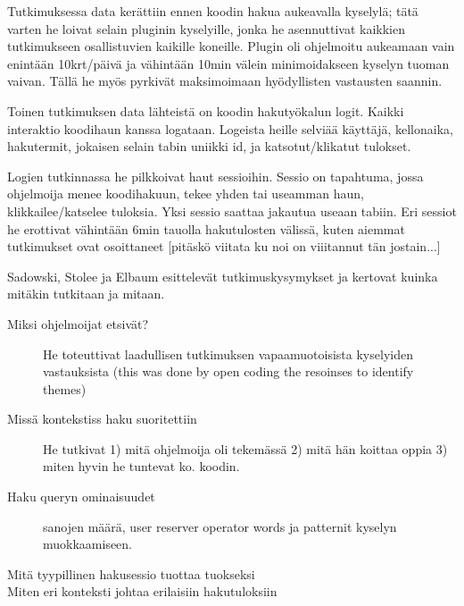 \documentclass[finnish]{../tktltiki2}
\theoremstyle{definition}
\theoremstyle{remark}
\begin{document}
Tutkimuksessa data kerättiin ennen koodin hakua aukeavalla kyselylä; tätä varten he loivat selain pluginin kyselyille, jonka he asennuttivat kaikkien tutkimukseen osallistuvien kaikille koneille. Plugin oli ohjelmoitu aukeamaan vain enintään 10krt/päivä ja vähintään 10min välein minimoidakseen kyselyn tuoman vaivan. Tällä he myös pyrkivät maksimoimaan hyödyllisten vastausten saannin.


Toinen tutkimuksen data lähteistä on koodin hakutyökalun logit. Kaikki interaktio koodihaun kanssa logataan. Logeista heille selviää käyttäjä, kellonaika, hakutermit, jokaisen selain tabin uniikki id, ja katsotut/klikatut tulokset.

Logien tutkinnassa he pilkkoivat haut sessioihin. Sessio on tapahtuma, jossa ohjelmoija menee koodihakuun, tekee yhden tai useamman haun, klikkailee/katselee tuloksia. Yksi sessio saattaa jakautua useaan tabiin. Eri sessiot he erottivat vähintään 6min tauolla hakutulosten välissä, kuten aiemmat tutkimukset ovat osoittaneet [pitäskö viitata ku noi on viiitannut tän jostain...]



Sadowski, Stolee ja Elbaum esittelevät tutkimuskysymykset ja kertovat kuinka mitäkin tutkitaan ja mitaan.

\begin{description}

  \item [Miksi ohjelmoijat etsivät?] He toteuttivat laadullisen tutkimuksen vapaamuotoisista kyselyiden vastauksista (this was done by open coding the resoinses to identify themes)

  \item [Missä kontekstiss haku suoritettiin] He tutkivat 1) mitä ohjelmoija oli tekemässä 2) mitä hän koittaa oppia 3) miten hyvin he tuntevat ko. koodin.

  \item [Haku queryn ominaisuudet] sanojen määrä, user reserver operator words ja patternit kyselyn muokkaamiseen.

  \item [Mitä tyypillinen hakusessio tuottaa tuokseksi]

  \item [Miten eri konteksti johtaa erilaisiin hakutuloksiin]

\end{description}
\end{document}
